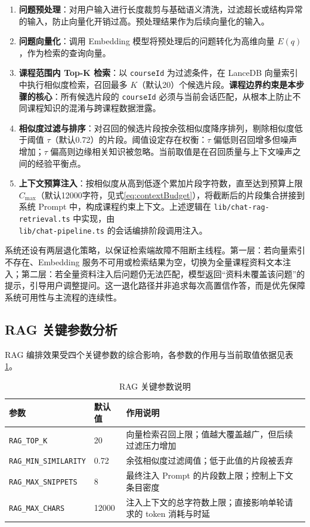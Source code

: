 \documentclass[12pt,a4paper,oneside]{ctexbook}
\numberwithin{equation}{chapter}
\begin{document}
\begin{enumerate}
  \item \textbf{问题预处理}：对用户输入进行长度裁剪与基础语义清洗，过滤超长或结构异常的输入，防止向量化开销过高。预处理结果作为后续向量化的输入。

  \item \textbf{问题向量化}：调用 Embedding 模型将预处理后的问题转化为高维向量 $E(q)$，作为检索的查询向量。

  \item \textbf{课程范围内 Top-K 检索}：以 \texttt{courseId} 为过滤条件，在 LanceDB 向量索引中执行相似度检索，召回最多 $K$（默认20）个候选片段。\textbf{课程边界约束是本步骤的核心}：所有候选片段的 \texttt{courseId} 必须与当前会话匹配，从根本上防止不同课程知识的混淆与跨课程数据泄露。

  \item \textbf{相似度过滤与排序}：对召回的候选片段按余弦相似度降序排列，剔除相似度低于阈值 $\tau$（默认0.72）的片段。阈值设定存在权衡：$\tau$ 偏低则召回增多但噪声增加；$\tau$ 偏高则边缘相关知识被忽略。当前取值是在召回质量与上下文噪声之间的经验平衡点。

  \item \textbf{上下文预算注入}：按相似度从高到低逐个累加片段字符数，直至达到预算上限 $C_{\max}$（默认12000字符，见式\eqref{eq:contextBudget}），将截断后的片段集合拼接到系统 Prompt 中，构成课程约束上下文。上述逻辑在 \texttt{lib/chat-rag-retrieval.ts} 中实现，由 \\ \texttt{lib/chat-pipeline.ts} 的会话编排阶段调用注入。
\end{enumerate}

系统还设有两层退化策略，以保证检索端故障不阻断主线程。第一层：若向量索引不存在、Embedding 服务不可用或检索结果为空，切换为全量课程资料文本注入；第二层：若全量资料注入后问题仍无法匹配，模型返回“资料未覆盖该问题”的提示，引导用户调整提问。这一退化路径并非追求每次高置信作答，而是优先保障系统可用性与主流程的连续性。

\subsection{RAG 关键参数分析}

RAG 编排效果受四个关键参数的综合影响，各参数的作用与当前取值依据见表\ref{tab:ragParams}。

\begin{table}[H]
\centering
\caption{RAG 关键参数说明}
\label{tab:ragParams}
\begin{tabular}{p{3.8cm}p{1.8cm}p{7.8cm}}
\toprule
参数 & 默认值 & 作用说明 \\
\midrule
\texttt{RAG\_TOP\_K} & 20 & 向量检索召回上限；值越大覆盖越广，但后续过滤压力增加 \\
\texttt{RAG\_MIN\_SIMILARITY} & 0.72 & 余弦相似度过滤阈值；低于此值的片段被丢弃 \\
\texttt{RAG\_MAX\_SNIPPETS} & 8 & 最终注入 Prompt 的片段数上限；控制上下文条目密度 \\
\texttt{RAG\_MAX\_CHARS} & 12000 & 注入上下文的总字符数上限；直接影响单轮请求的 token 消耗与时延 \\
\bottomrule
\end{tabular}
\end{table}
\end{document}
